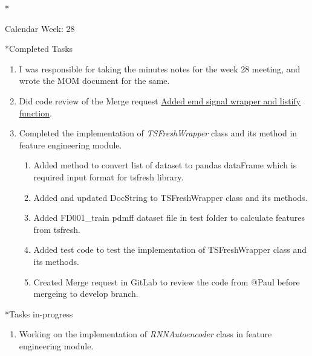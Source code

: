 \documentclass[11pt,a4paper]{article}
\begin{document}
\newpage
\begin{section}*{Calendar Week: 28 \hfill \date{16 July, 2021}}
 \begin{subsection}*{Completed Tasks}
     \begin{enumerate}
         \item I was responsible for taking the minutes notes for the week 28 meeting, and wrote the MOM document for the same.
         \item Did code review of the Merge request \href{https://git.cs.uni-paderborn.de/machine-learning-for-predictive-maintenance/code/-/merge_requests/19}{Added emd signal wrapper and listify function}.
         \item Completed the implementation of \textit{TSFreshWrapper} class and its method in feature engineering module.
               \begin{enumerate}
                   \item Added method to convert list of dataset to pandas dataFrame which is required input format for tsfresh library.
                   \item Added and updated DocString to TSFreshWrapper class and its methods.
                   \item Added FD001\_train pdmff dataset file in test folder to calculate features from tsfresh.
                   \item Added test code to test the implementation of TSFreshWrapper class and its methods.
                   \item Created Merge request in GitLab to review the code from @Paul before mergeing to develop branch.
               \end{enumerate}
     \end{enumerate}
 \end{subsection}
 \begin{subsection}*{Tasks in-progress}
     \begin{enumerate}
         \item Working on the implementation of \textit{RNNAutoencoder} class in feature engineering module.
     \end{enumerate}
 \end{subsection}
\end{section}
\end{document}
